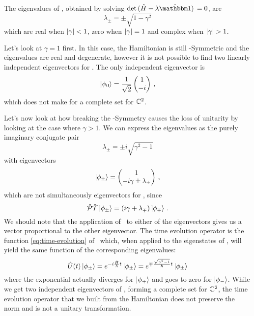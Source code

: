         The eigenvalues of \hH, obtained by solving $\det\pqty*{\hH - \lambda\hidM} = 0$, are
        \begin{equation*}
            \lambda_\pm = \pm\sqrt{1-\gamma^2}
        \end{equation*}
        which are real when $\abs{\gamma} < 1$, zero when $\abs{\gamma} = 1$ and complex when $\abs{\gamma} > 1$.
        
        Let's look at $\gamma = 1$ first. In this case, the Hamiltonian is still \PT-Symmetric and the eigenvalues are real and degenerate, however it is not possible to find two linearly independent eigenvectors for \hH. The only independent eigenvector is
        \begin{equation*}
            \ket{\phi_0} = \frac{1}{\sqrt{2}}\pmqty{1 \\ -i}
            \mycomma
        \end{equation*}
        which does not make for a complete set for $\mathbb{C}^2$.

        Let's now look at how breaking the \PT-Symmetry causes the loss of unitarity by looking at the case where $\gamma > 1$. We can express the eigenvalues as the purely imaginary conjugate pair
        \begin{equation*}
            \lambda_\pm = \pm i \sqrt{\gamma^2 - 1}
        \end{equation*}
        with eigenvectors
        \begin{equation*}
            \ket{\phi_\pm} = \pmqty{1 \\ -i\gamma \pm \lambda_\pm}
            \mycomma
        \end{equation*}
        which are not simultaneously eigenvectors for \hPT, since
        \begin{equation*}
            \hPT\ket{\phi_\pm} = \pqty{i\gamma + \lambda_\mp}\ket{\phi_\mp}
            \myperiod
        \end{equation*}
        We should note that the application of \hPT\ to either of the eigenvectors gives us a vector proportional to the other eigenvector. The time evolution operator is the function \eqref{eq:time-evolution} of \hH\ which, when applied to the eigenstates of \hH, will yield the same function of the corresponding eigenvalues:
        \begin{equation*}
            \hU\pqty{t}\ket{\phi_\pm} = \myexp{-i\frac{\hH}{\hbar}t}\ket{\phi_\pm} = \myexp{\mp\frac{\sqrt{\gamma^2-1}}{\hbar}t}\ket{\phi_\pm}
        \end{equation*}
        where the exponential actually diverges for $\ket{\phi_+}$ and goes to zero for $\ket{\phi_-}$. While we get two independent eigenvectors of \hH, forming a complete set for $\mathbb{C}^2$, the time evolution operator that we built from the Hamiltonian does not preserve the norm and is not a unitary transformation.

